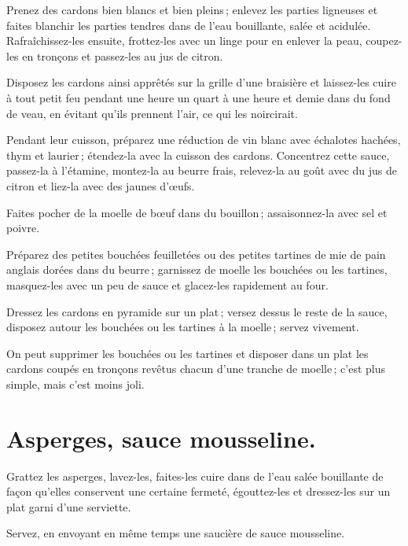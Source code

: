 Prenez des cardons bien blancs et bien pleins ; enlevez les parties ligneuses
et faites blanchir les parties tendres dans de l'eau bouillante, salée et
acidulée. Rafraîchissez-les ensuite, frottez-les avec un linge pour en enlever
la peau, coupez-les en tronçons et passez-les au jus de citron.

Disposez les cardons ainsi apprêtés sur la grille d'une braisière et laissez-les
cuire à tout petit feu pendant une heure un quart à une heure et demie dans du
fond de veau, en évitant qu'ils prennent l'air, ce qui les noircirait.

Pendant leur cuisson, préparez une réduction de vin blanc avec échalotes
hachées, thym et laurier ; étendez-la avec la cuisson des cardons. Concentrez
cette sauce, passez-la à l'étamine, montez-la au beurre frais, relevez-la au
goût avec du jus de citron et liez-la avec des jaunes d'œufs.

Faites pocher de la moelle de bœuf dans du bouillon ; assaisonnez-la avec sel
et poivre.

Préparez des petites bouchées feuilletées ou des petites tartines de mie de pain
anglais dorées dans du beurre ; garnissez de moelle les bouchées ou les tartines,
masquez-les avec un peu de sauce et glacez-les rapidement au four.

Dressez les cardons en pyramide sur un plat ; versez dessus le reste de la
sauce, disposez autour les bouchées ou les tartines à la moelle ; servez
vivement.

\sk

On peut supprimer les bouchées ou les tartines et disposer dans un plat les
cardons coupés en tronçons revêtus chacun d'une tranche de moelle ; c'est plus
simple, mais c'est moins joli.

\section*{\centering Asperges, sauce mousseline.}
{}

Grattez les asperges, lavez-les, faites-les cuire dans de l'eau salée
bouillante de façon qu'elles conservent une certaine fermeté, égouttez-les et
dressez-les sur un plat garni d'une serviette.

Servez, en envoyant en même temps une saucière de sauce mousseline.


